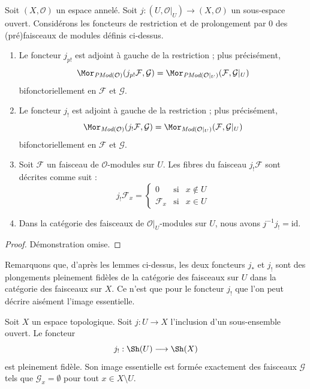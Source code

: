 \begin{lemma}
\label{lemma-j-shriek-modules}
Soit $(X, \mathcal{O})$ un espace annelé.
Soit $j : (U, \mathcal{O}|_U) \to (X, \mathcal{O})$
un sous-espace ouvert.
Considérons les foncteurs de restriction et de prolongement
par $0$ des (pré)faisceaux de modules définis ci-dessus.
\begin{enumerate}
\item Le foncteur $j_{p!}$ est adjoint à gauche de la restriction ;
plus précisément,
$$
\Mor_{\textit{PMod}(\mathcal{O})}(j_{p!}\mathcal{F}, \mathcal{G})
=
\Mor_{\textit{PMod}(\mathcal{O}|_U)}(\mathcal{F}, \mathcal{G}|_U)
$$
bifonctoriellement en $\mathcal{F}$ et $\mathcal{G}$.
\item Le foncteur $j_!$ est adjoint à gauche de la restriction ;
plus précisément,
$$
\Mor_{\textit{Mod}(\mathcal{O})}(j_!\mathcal{F}, \mathcal{G})
=
\Mor_{\textit{Mod}(\mathcal{O}|_U)}(\mathcal{F}, \mathcal{G}|_U)
$$
bifonctoriellement en $\mathcal{F}$ et $\mathcal{G}$.
\item Soit $\mathcal{F}$ un faisceau de $\mathcal{O}$-modules sur $U$.
Les fibres du faisceau $j_!\mathcal{F}$ sont décrites
comme suit :
$$
j_{!}\mathcal{F}_x =
\left\{
\begin{matrix}
0 & \text{si} & x \not \in U \\
\mathcal{F}_x & \text{si} & x \in U
\end{matrix}
\right.
$$
\item Dans la catégorie des faisceaux de $\mathcal{O}|_U$-modules sur $U$,
nous avons $j^{-1}j_! = \text{id}$.
\end{enumerate}
\end{lemma}

\begin{proof}
Démonstration omise.
\end{proof}

\noindent
Remarquons que, d'après les lemmes ci-dessus, les deux foncteurs
$j_*$ et $j_!$ sont des plongements pleinement fidèles de
la catégorie des faisceaux sur $U$ dans la catégorie
des faisceaux sur $X$. Ce n'est que pour le foncteur
$j_!$ que l'on peut décrire aisément l'image
essentielle.

\begin{lemma}
\label{lemma-equivalence-categories-open}
Soit $X$ un espace topologique.
Soit $j : U \to X$ l'inclusion d'un sous-ensemble ouvert.
Le foncteur
$$
j_! : \Sh(U) \longrightarrow \Sh(X)
$$
est pleinement fidèle. Son image essentielle est formée exactement
des faisceaux $\mathcal{G}$ tels que
$\mathcal{G}_x = \emptyset$ pour tout $x \in X \setminus U$.
\end{lemma}

